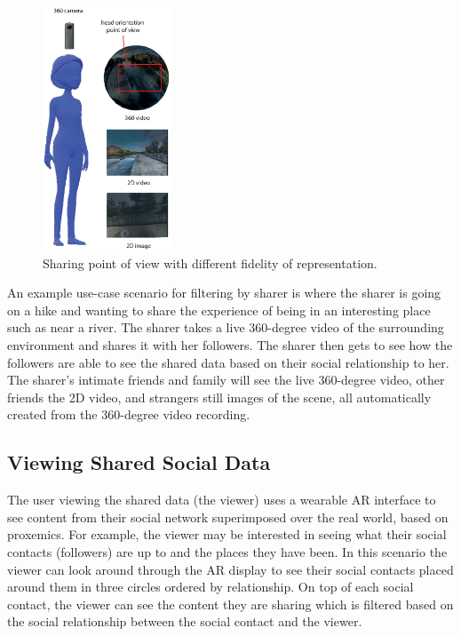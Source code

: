 \begin{figure}[ht]
    \centering
    \includegraphics[width=1.5in]{images/chi/images-04.eps}
    \caption{Sharing point of view with different fidelity of representation.}
    \label{fig:data:sharer}
\end{figure}

An example use-case scenario for filtering by sharer is where the sharer is going on a hike and wanting to share the experience of being in an interesting place such as near a river. The sharer takes a live 360-degree video of the surrounding environment and shares it with her followers. The sharer then gets to see how the followers are able to see the shared data based on their social relationship to her. The sharer's intimate friends and family will see the live 360-degree video, other friends the 2D video, and strangers still images of the scene, all automatically created from the 360-degree video recording.

\subsection{Viewing Shared Social Data}

The user viewing the shared data (the viewer) uses a wearable AR interface to see content from their social network superimposed over the real world, based on proxemics. For example, the viewer may be interested in seeing what their social contacts (followers) are up to and the places they have been. In this scenario the viewer can look around through the AR display to see their social contacts placed around them in three circles ordered by relationship. On top of each social contact, the viewer can see the content they are sharing which is filtered based on the social relationship between the social contact and the viewer.

